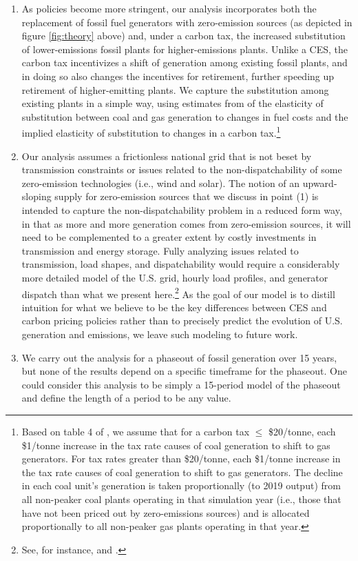 \documentclass[12pt]{article}
\begin{document}
\begin{enumerate}
    \item As policies become more stringent, our analysis incorporates both the replacement of fossil fuel generators with zero-emission sources (as depicted in figure \ref{fig:theory} above) and, under a carbon tax, the increased substitution of lower-emissions fossil plants for higher-emissions plants. Unlike a CES, the carbon tax incentivizes a shift of generation among existing fossil plants, and in doing so also changes the incentives for retirement, further speeding up retirement of higher-emitting plants. We capture the substitution among existing plants in a simple way, using estimates from \cite{cullmans17} of the elasticity of substitution between coal and gas generation to changes in fuel costs and the implied elasticity of substitution to changes in a carbon tax.\footnote{Based on table 4 of \cite{cullmans17}, we assume that for a carbon tax $\leq$ \$20/tonne, each \$1/tonne increase in the tax rate causes of coal generation to shift to gas generators. For tax rates greater than \$20/tonne, each \$1/tonne increase in the tax rate causes of coal generation to shift to gas generators. The decline in each coal unit's generation is taken proportionally (to 2019 output) from all non-peaker coal plants operating in that simulation year (i.e., those that have not been priced out by zero-emissions sources) and is allocated proportionally to all non-peaker gas plants operating in that year.}  
    
    \item Our analysis assumes a frictionless national grid that is not beset by transmission constraints or issues related to the non-dispatchability of some zero-emission technologies (i.e., wind and solar). The notion of an upward-sloping supply for zero-emission sources that we discuss in point (1) is intended to capture the non-dispatchability problem in a reduced form way, in that as more and more generation comes from zero-emission sources, it will need to be complemented to a greater extent by costly investments in transmission and energy storage. Fully analyzing issues related to transmission, load shapes, and dispatchability would require a considerably more detailed model of the U.S. grid, hourly load profiles, and generator dispatch than what we present here.\footnote{See, for instance, \cite{dimanchevknittel2020} and \cite{stock2021robust}.} As the goal of our model is to distill intuition for what we believe to be the key differences between CES and carbon pricing policies rather than to precisely predict the evolution of U.S. generation and emissions, we leave such modeling to future work.

    \item We carry out the analysis for a phaseout of fossil generation over 15 years, but none of the results depend on a specific timeframe for the phaseout. One could consider this analysis to be simply a 15-period model of the phaseout and define the length of a period to be any value.
\end{enumerate}
\end{document}
